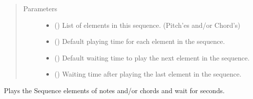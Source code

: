 \documentclass[letterpaper,10pt,english]{sphinxmanual}
\begin{document}
\begin{fulllineitems}
\begin{fulllineitems}
\begin{description}
\end{description}
\begin{quote}\begin{description}
\item[{Parameters}] \leavevmode\begin{itemize}
\item {} 
\sphinxAtStartPar
{} () \textendash{} List of elements in this sequence.
(Pitch’es and/or Chord’s)

\item {} 
\sphinxAtStartPar
{} () \textendash{} Default playing time for each element in the
sequence.

\item {} 
\sphinxAtStartPar
{} () \textendash{} Default waiting time to play the next element
in the sequence.

\item {} 
\sphinxAtStartPar
{} () \textendash{} Waiting time after playing the last element
in the sequence.

\end{itemize}

\end{description}\end{quote}

\end{fulllineitems}


\begin{fulllineitems}
\label{\detokenize{index:birdears.sequence.Sequence.async_play}}
\sphinxAtStartPar
Plays the Sequence elements of notes and/or chords and wait for
 seconds.

\end{fulllineitems}



\end{fulllineitems}
\end{document}
